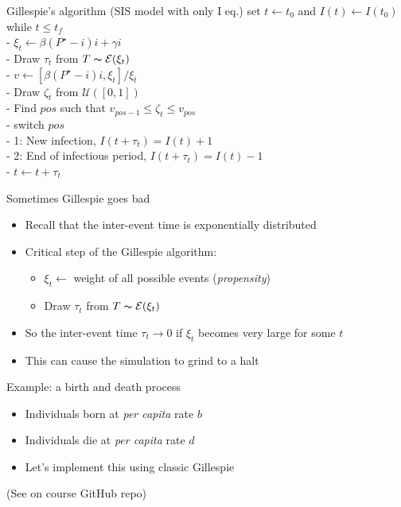 \documentclass[aspectratio=43]{beamer}
\begin{document}
\begin{frame}{Gillespie's algorithm (SIS model with only I eq.)}
set $t\leftarrow t_0$ and $I(t)\leftarrow I(t_0)$\\
while {$t\leq t_f$}\\
- $\xi_t\leftarrow \beta (P^\star-i)i+\gamma i$\\
- Draw $\tau_t$ from $T\thicksim \mathcal{E}(\xi_t)$\\
- $v\leftarrow\left[\beta (P^\star-i)i,\xi_t\right]/\xi_t$\\
- Draw $\zeta_t$ from $\mathcal{U}([0,1])$\\
- Find $pos$ such that $v_{pos-1}\leq\zeta_t\leq v_{pos}$\\
- switch {$pos$}\\
\qquad - 1: New infection, $I(t+\tau_t)=I(t)+1$ \\
\qquad - 2: End of infectious period, $I(t+\tau_t)=I(t)-1$ \\
- $t\leftarrow t+\tau_t$
\end{frame}


\begin{frame}{Sometimes Gillespie goes bad}
    \begin{itemize}
        \item Recall that the inter-event time is exponentially distributed
        \item Critical step of the Gillespie algorithm:
        \begin{itemize}
            \item $\xi_t\leftarrow$ weight of all possible events (\emph{propensity})
            \item Draw $\tau_t$ from $T\thicksim \mathcal{E}(\xi_t)$
        \end{itemize}
        \item So the inter-event time $\tau_t\to 0$ if $\xi_t$ becomes very large for some $t$
        \item This can cause the simulation to grind to a halt
    \end{itemize}
\end{frame}


\begin{frame}{Example: a birth and death process}
    \begin{itemize}
        \item Individuals born at \emph{per capita} rate $b$
        \item Individuals die at \emph{per capita} rate $d$
        \item Let's implement this using classic Gillespie
    \end{itemize}
    \vfill
(See \href{https://raw.githubusercontent.com/julien-arino/3MC-course-epidemiological-modelling/main/CODE/simulate_birth_death_CTMC.R}{} on course GitHub repo)
\end{frame}
\end{document}
